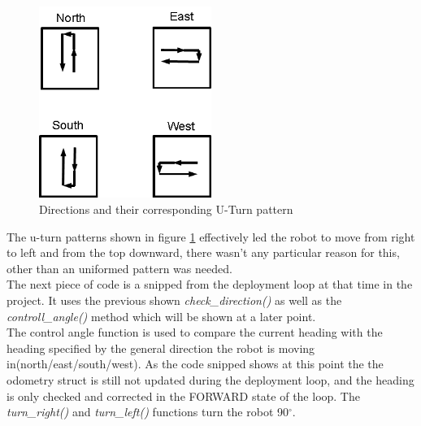 \begin{figure}[h]
\centering
\includegraphics[width = 0.5\textwidth]{../../figures/direction_uturn_pattern} 
\caption{Directions and their corresponding U-Turn pattern}
\label{directions_uturn_pattern}
\end{figure}

The u-turn patterns shown in figure \ref{directions_uturn_pattern} effectively led the robot to move from right to left and from the top downward, there wasn't any particular reason for this, other than an uniformed pattern was needed. \\ 
The next piece of code is a snipped from the deployment loop at that time in the project. It uses the previous shown \textit{check\_direction()} as well as the \textit{controll\_angle()} method which will be shown at a later point.\\
The control angle function is used to compare the current heading with the heading specified by the general direction the robot is moving in(north/east/south/west). 
As the code snipped shows at this point the the odometry struct is still not updated during the deployment loop, and the heading is only checked and corrected in the FORWARD state of the loop. 
The \textit{turn\_right()} and \textit{turn\_left()} functions turn the robot 90$^{\circ}$.

